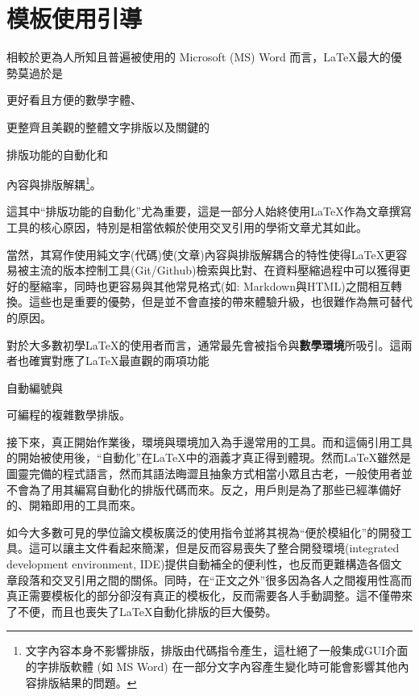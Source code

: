 \documentclass[12pt]{report}
\theoremstyle{plain}
\begin{document}
\section{模板使用引導}

相較於更為人所知且普遍被使用的 Microsoft (MS) Word 而言，\LaTeX{}最大的優勢莫過於是
\begin{enumerate*}
    \item 更好看且方便的數學字體、
    \item 更整齊且美觀的整體文字排版以及關鍵的
    \item 排版功能的自動化和
    \item 內容與排版解耦\footnote{文字內容本身不影響排版，排版由代碼指令產生，這杜絕了一般集成GUI介面的字排版軟體 (如 MS Word) 在一部分文字內容產生變化時可能會影響其他內容排版結果的問題。}。
\end{enumerate*}
這其中``排版功能的自動化''尤為重要，這是一部分人始終使用\LaTeX{}作為文章撰寫工具的核心原因，特別是相當依賴於使用交叉引用的學術文章尤其如此。

當然，其寫作使用純文字(代碼)使(文章)內容與排版解耦合的特性使得\LaTeX{}更容易被主流的版本控制工具(Git/Github)檢索與比對、在資料壓縮過程中可以獲得更好的壓縮率，同時也更容易與其他常見格式(如: Markdown與HTML)之間相互轉換。這些也是重要的優勢，但是並不會直接的帶來體驗升級，也很難作為無可替代的原因。

對於大多數初學\LaTeX 的使用者而言，通常最先會被指令與\textbf{數學環境}所吸引。這兩者也確實對應了\LaTeX{}最直觀的兩項功能
\begin{enumerate*}
    \item 自動編號與
    \item 可編程的複雜數學排版。
\end{enumerate*}
接下來，真正開始作業後，環境與環境加入為手邊常用的工具。而和這倆引用工具的開始被使用後，``自動化''在\LaTeX{}中的涵義才真正得到體現。然而\LaTeX{}雖然是圖靈完備的程式語言，然而其語法晦澀且抽象方式相當小眾且古老，一般使用者並不會為了用其編寫自動化的排版代碼而來。反之，用戶則是為了那些已經準備好的、開箱即用的工具而來。

如今大多數可見的學位論文模板廣泛的使用指令並將其視為``便於模組化''的開發工具。這可以讓主文件看起來簡潔，但是反而容易喪失了整合開發環境(integrated development environment, IDE)提供自動補全的便利性，也反而更難構造各個文章段落和交叉引用之間的關係。同時，在``正文之外''很多因為各人之間複用性高而真正需要模板化的部分卻沒有真正的模板化，反而需要各人手動調整。這不僅帶來了不便，而且也喪失了\LaTeX 自動化排版的巨大優勢。
\end{document}
